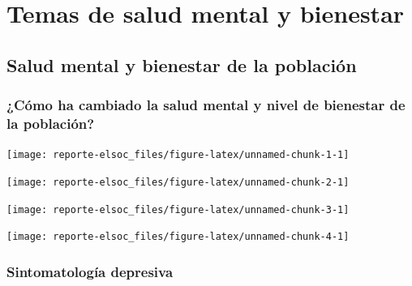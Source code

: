 \documentclass[
  12pt,
]{book}
\begin{document}
\hypertarget{temas-de-salud-mental-y-bienestar}{%
\chapter{Temas de salud mental y bienestar}\label{temas-de-salud-mental-y-bienestar}}

\hypertarget{salud-mental-y-bienestar-de-la-poblaciuxf3n}{%
\section{Salud mental y bienestar de la población}\label{salud-mental-y-bienestar-de-la-poblaciuxf3n}}

\hypertarget{cuxf3mo-ha-cambiado-la-salud-mental-y-nivel-de-bienestar-de-la-poblaciuxf3n}{%
\subsection{¿Cómo ha cambiado la salud mental y nivel de bienestar de la población?}\label{cuxf3mo-ha-cambiado-la-salud-mental-y-nivel-de-bienestar-de-la-poblaciuxf3n}}

\begin{center}\texttt{[image: reporte-elsoc\_files/figure-latex/unnamed-chunk-1-1]} \end{center}

\begin{center}\texttt{[image: reporte-elsoc\_files/figure-latex/unnamed-chunk-2-1]} \end{center}

\begin{center}\texttt{[image: reporte-elsoc\_files/figure-latex/unnamed-chunk-3-1]} \end{center}

\begin{center}\texttt{[image: reporte-elsoc\_files/figure-latex/unnamed-chunk-4-1]} \end{center}

\hypertarget{sintomatologuxeda-depresiva}{%
\subsection{Sintomatología depresiva}\label{sintomatologuxeda-depresiva}}
\end{document}
